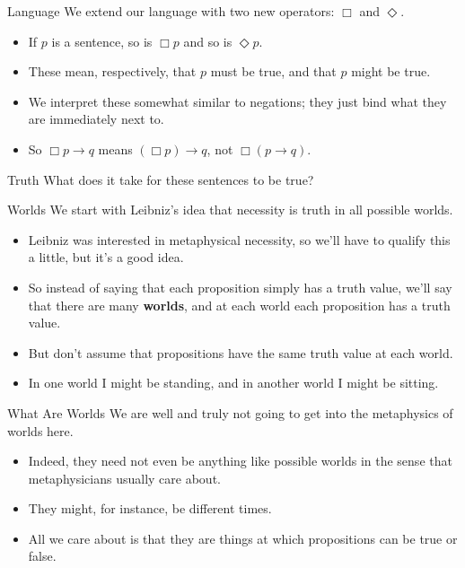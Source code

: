 \documentclass[
  14pt,
  letterpaper,
  ignorenonframetext,
  aspectratio=169,
  handout]{beamer}
\providecommand{\tightlist}{%
  \setlength{\itemsep}{0pt}\setlength{\parskip}{0pt}}\usepackage{longtable,booktabs,array}
\begin{document}
\begin{frame}{Language}
\protect\hypertarget{language}{}
We extend our language with two new operators: \(\Box\) and
\(\Diamond\).

\begin{itemize}[<+->]
\tightlist
\item
  If \(p\) is a sentence, so is \(\Box p\) and so is \(\Diamond p\).
\item
  These mean, respectively, that \(p\) must be true, and that \(p\)
  might be true.
\item
  We interpret these somewhat similar to negations; they just bind what
  they are immediately next to.
\item
  So \(\Box p \rightarrow q\) means \((\Box p) \rightarrow q\), not
  \(\Box(p \rightarrow q)\).
\end{itemize}
\end{frame}

\begin{frame}{Truth}
\protect\hypertarget{truth}{}
What does it take for these sentences to be true?
\end{frame}

\begin{frame}{Worlds}
\protect\hypertarget{worlds}{}
We start with Leibniz's idea that necessity is truth in all possible
worlds.

\begin{itemize}[<+->]
\tightlist
\item
  Leibniz was interested in metaphysical necessity, so we'll have to
  qualify this a little, but it's a good idea.
\item
  So instead of saying that each proposition simply has a truth value,
  we'll say that there are many \textbf{worlds}, and at each world each
  proposition has a truth value.
\item
  But don't assume that propositions have the same truth value at each
  world.
\item
  In one world I might be standing, and in another world I might be
  sitting.
\end{itemize}
\end{frame}

\begin{frame}{What Are Worlds}
\protect\hypertarget{what-are-worlds}{}
We are well and truly not going to get into the metaphysics of worlds
here.

\begin{itemize}[<+->]
\tightlist
\item
  Indeed, they need not even be anything like possible worlds in the
  sense that metaphysicians usually care about.
\item
  They might, for instance, be different times.
\item
  All we care about is that they are things at which propositions can be
  true or false.
\end{itemize}
\end{frame}
\end{document}
